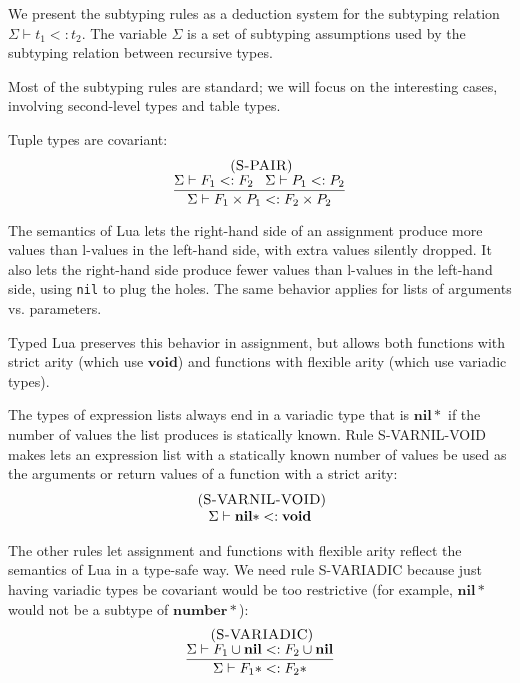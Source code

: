 \documentclass{sigplanconf}
\newcommand{\Nil}{\mathbf{nil}}
\newcommand{\Number}{\mathbf{number}}
\newcommand{\Void}{\mathbf{void}}
\newcommand{\mylabel}[1]{\; (\textsc{#1})}
\newcommand{\senv}{\Sigma}
\newcommand{\subtype}{<:}
\begin{document}
We present the subtyping rules as a deduction system for the
subtyping relation $\senv \vdash t_{1} \subtype t_{2}$.
The variable $\senv$ is a set of subtyping assumptions used
by the subtyping relation between recursive types.

Most of the subtyping rules are standard; we will focus
on the interesting cases, involving second-level types and
table types.

Tuple types are covariant:
\[
\begin{array}{c}
\mylabel{S-PAIR}\\
\dfrac{\senv \vdash F_{1} \subtype F_{2} \;\;\;
       \senv \vdash P_{1} \subtype P_{2}}
      {\senv \vdash F_{1} \times P_{1} \subtype F_{2} \times P_{2}}
\end{array}
\]

The semantics of Lua lets the right-hand side of an assignment
produce more values than l-values in the left-hand side,
with extra values silently dropped. It also lets the
right-hand side produce fewer values than l-values in the
left-hand side, using {\tt nil} to plug the holes. The
same behavior applies for lists of arguments vs. parameters.

Typed Lua preserves this behavior in assignment, but allows
both functions with strict arity (which use $\Void$) and
functions with flexible arity (which use variadic types).

The types of expression lists always end in a variadic type
that is $\Nil{*}$ if the number of values the list produces
is statically known. Rule \textsc{S-VARNIL-VOID} makes lets
an expression list with a statically known number of
values be used as the arguments or return values of a function
with a strict arity:
\[
\begin{array}{c}
\mylabel{S-VARNIL-VOID}\\
\senv \vdash \Nil{*} \subtype \Void
\end{array}
\]

The other rules let assignment and functions with flexible
arity reflect the semantics of Lua in a type-safe way. We
need rule {\sc S-VARIADIC} because just having variadic
types be covariant would be too restrictive (for example,
$\Nil{*}$ would not be a subtype of $\Number{*}$):
\[
\begin{array}{c}
\mylabel{S-VARIADIC}\\
\dfrac{\senv \vdash F_{1} \cup \Nil \subtype F_{2} \cup \Nil}
      {\senv \vdash F_{1}{*} \subtype F_{2}{*}}
\end{array}
\]
\end{document}
